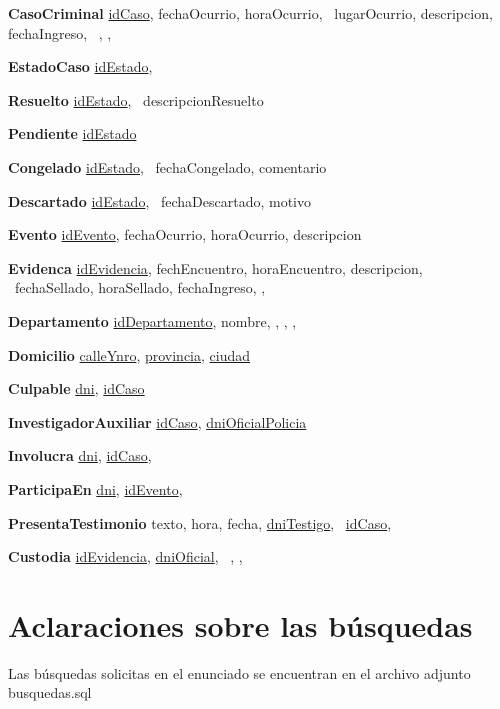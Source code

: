 \documentclass[11pt, a4paper]{article}
\begin{document}
\textbf{CasoCriminal} {\underline{idCaso}, fechaOcurrio, horaOcurrio, \ 
	lugarOcurrio, descripcion, fechaIngreso, \
	, , \
	}

\textbf{EstadoCaso} {\underline{idEstado}, \dashuline{idCaso}}

\textbf{Resuelto} {\underline{idEstado}, \ 	
	descripcionResuelto}

\textbf{Pendiente} {\underline{idEstado}}

\textbf{Congelado} {\underline{idEstado}, \
	fechaCongelado, comentario}

\textbf{Descartado} {\underline{idEstado}, \
	fechaDescartado, motivo}

\textbf{Evento} {\underline{idEvento}, fechaOcurrio, horaOcurrio, descripcion} 

\textbf{Evidenca} {\underline{idEvidencia}, fechEncuentro, horaEncuentro, descripcion, \
	fechaSellado, horaSellado, fechaIngreso, , }

\textbf{Departamento} {\underline{idDepartamento}, nombre, , , , \ 
	}

\textbf{Domicilio} {\underline{calleYnro}, \underline{provincia}, \underline{ciudad}}

\textbf{Culpable} {\underline{dni}, \underline{idCaso}}

\textbf{InvestigadorAuxiliar} {\underline{idCaso}, \underline{dniOficialPolicia}}

\textbf{Involucra} {\underline{dni}, \underline{idCaso}, }

\textbf{ParticipaEn} {\underline{dni}, \underline{idEvento}, }

\textbf{PresentaTestimonio} {texto, hora, fecha, \underline{dniTestigo}, \
	\underline{idCaso}, }

\textbf{Custodia} {\underline{idEvidencia}, \underline{dniOficial}, \
	, , }



\section{Aclaraciones sobre las búsquedas}
Las búsquedas solicitas en el enunciado se encuentran en el archivo adjunto busquedas.sql

%
%
% 
%
\end{document}
